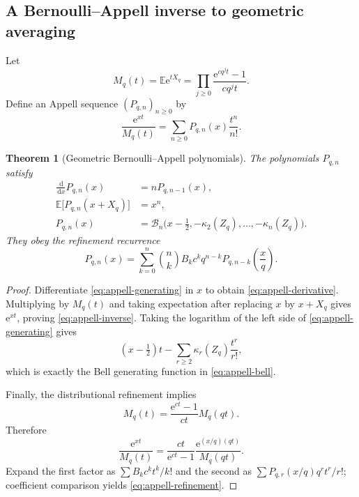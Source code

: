 \documentclass[11pt,oneside]{article}
\newtheorem{theorem}{Theorem}[section]
\theoremstyle{definition}
\theoremstyle{remark}
\newcommand{\E}{\mathbb E}
\newcommand{\e}{\mathrm e}
\newcommand{\dd}{\,\mathrm d}
\begin{document}
\subsection{A Bernoulli--Appell inverse to geometric averaging}

Let
\begin{equation}
 M_q(t)=\E\e^{tX_q}
 =\prod_{j\ge0}\frac{\e^{cq^jt}-1}{cq^jt}.                   \label{eq:mgf-product}
\end{equation}
Define an Appell sequence $(P_{q,n})_{n\ge0}$ by
\begin{equation}
 \frac{\e^{xt}}{M_q(t)}
 =\sum_{n\ge0}P_{q,n}(x)\frac{t^n}{n!}.                     \label{eq:appell-generating}
\end{equation}

\begin{theorem}[Geometric Bernoulli--Appell polynomials]
\label{thm:appell}
The polynomials $P_{q,n}$ satisfy
\begin{align}
 \frac{\dd}{\dd x}P_{q,n}(x)&=nP_{q,n-1}(x),                 \label{eq:appell-derivative}\\
 \E\bigl[P_{q,n}(x+X_q)\bigr]&=x^n,                         \label{eq:appell-inverse}\\
 P_{q,n}(x)
 &=\mathcal B_n\bigl(x-\tfrac12,-\kappa_2(Z_q),\ldots,-\kappa_n(Z_q)\bigr). \label{eq:appell-bell}
\end{align}
They obey the refinement recurrence
\begin{equation}
 \boxed{\displaystyle
 P_{q,n}(x)
 =\sum_{k=0}^{n}\binom nk B_k c^k q^{n-k}
 P_{q,n-k}\!\left(\frac{x}{q}\right).}                     \label{eq:appell-refinement}
\end{equation}
\end{theorem}

\begin{proof}
Differentiate \eqref{eq:appell-generating} in $x$ to obtain
\eqref{eq:appell-derivative}.  Multiplying by $M_q(t)$ and taking expectation after replacing
$x$ by $x+X_q$ gives $\e^{xt}$, proving \eqref{eq:appell-inverse}.  Taking the logarithm of
the left side of \eqref{eq:appell-generating} gives
\[
 (x-\tfrac12)t-\sum_{r\ge2}\kappa_r(Z_q)\frac{t^r}{r!},
\]
which is exactly the Bell generating function in \eqref{eq:appell-bell}.

Finally, the distributional refinement implies
\[
 M_q(t)=\frac{\e^{ct}-1}{ct}M_q(qt).
\]
Therefore
\[
 \frac{\e^{xt}}{M_q(t)}
 =\frac{ct}{\e^{ct}-1}
  \frac{\e^{(x/q)(qt)}}{M_q(qt)}.
\]
Expand the first factor as $\sum B_kc^kt^k/k!$ and the second as
$\sum P_{q,r}(x/q)q^rt^r/r!$; coefficient comparison yields
\eqref{eq:appell-refinement}.
\end{proof}
\end{document}
